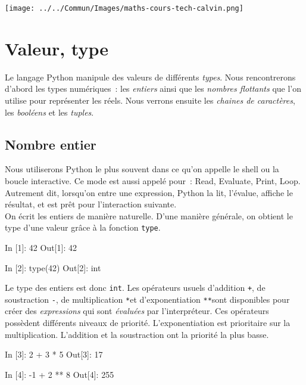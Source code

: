 \documentclass{magnolia}
\begin{document}
\hfill\texttt{[image: ../../Commun/Images/maths-cours-tech-calvin.png]}\\

\magtoc

\section{Valeur, type}

Le langage Python manipule des valeurs de différents \emph{types}.
Nous rencontrerons d'abord les types numériques~: les \emph{entiers} ainsi que les
\emph{nombres flottants} que l'on utilise pour représenter les réels. Nous verrons
ensuite les \emph{chaines de caractères}, les \emph{booléens} et les \emph{tuples}.

\subsection{Nombre entier}

Nous utiliserons Python le plus souvent dans ce qu'on
appelle le shell ou la boucle interactive. Ce mode est aussi appelé
 \fg pour~: Read, Evaluate, Print, Loop. Autrement dit, lorsqu'on entre
une expression, Python la lit, l'évalue, affiche le résultat, et est
prêt pour l'interaction suivante.\\

On écrit les entiers de manière naturelle. D'une manière générale,
on obtient le type d'une valeur grâce à la fonction \verb_type_. 

\begin{pythoncode}
In [1]: 42
Out[1]: 42

In [2]: type(42)
Out[2]: int
\end{pythoncode}

\noindent Le type des entiers est donc \verb_int_. 
Les opérateurs usuels d'addition \og\verb_+_\fg, de soustraction \og\verb_-_\fg, de
multiplication \og\verb+*+\fg et d'exponentiation \og\verb_**_\fg sont disponibles pour
créer des \emph{expressions} qui sont \emph{évaluées} par l'interpréteur. Ces opérateurs
possèdent différents niveaux de priorité. L'exponentiation est prioritaire sur 
la multiplication. L'addition et la soustraction ont la priorité la plus basse.

\begin{pythoncode}
In [3]: 2 + 3 * 5
Out[3]: 17

In [4]: -1 + 2 ** 8
Out[4]: 255
\end{pythoncode}
\end{document}
